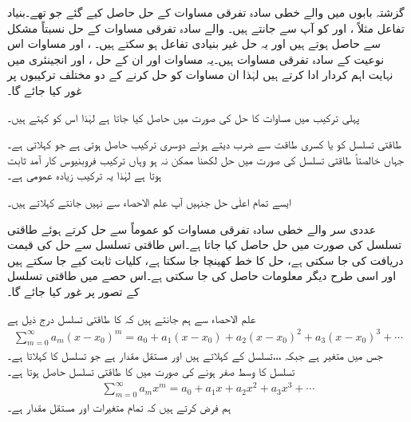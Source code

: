 گزشتہ بابوں میں  والے خطی سادہ تفرقی مساوات کے حل حاصل کیے گئے جو  تھے۔بنیاد تفاعل مثلاً ،  اور  کو آپ  سے جانتے ہیں۔ والے سادہ تفرقی مساوات کے حل نسبتاً مشکل سے حاصل ہوتے ہیں اور یہ حل غیر بنیادی تفاعل ہو سکتے ہیں۔ ،  اور  مساوات اس نوعیت کے سادہ تفرقی مساوات ہیں۔یہ مساوات اور ان کے حل ،  اور  انجینئری میں نہایت اہم کردار ادا کرتے ہیں لہٰذا ان مساوات کو حل کرنے کے دو مختلف ترکیبوں پر غور کیا جائے گا۔

پہلی ترکیب میں مساوات کا حل   کی صورت میں حاصل کیا جاتا ہے لہٰذا اس کو  کہتے ہیں۔

طاقتی تسلسل کو  یا کسری طاقت  سے ضرب دیتے ہوئے دوسری ترکیب حاصل ہوتی ہے جو  کہلاتی ہے۔جہاں خالصتاً طاقتی تسلسل کی صورت میں حل لکھنا ممکن نہ ہو وہاں ترکیب فروبنیوس کار آمد ثابت ہوتا ہے لہٰذا یہ ترکیب زیادہ عمومی ہے۔

ایسے تمام اعلٰی حل جنہیں آپ علم الاحصاء سے نہیں جانتے   کہلاتے ہیں۔

 عددی سر والے خطی سادہ تفرقی مساوات کو عموماً  سے حل کرتے ہوئے طاقتی تسلسل کی صورت میں حل حاصل کیا جاتا ہے۔اس طاقتی تسلسل سے حل کی قیمت دریافت کی جا سکتی ہے، حل کا خط کھینچا جا سکتا ہے، کلیات ثابت کیے جا سکتے ہیں اور اسی طرح دیگر معلومات حاصل کی جا سکتی ہے۔اس حصے میں طاقتی تسلسل کے تصور پر غور کیا جائے گا۔

علم الاحصاء سے ہم جانتے ہیں کہ  کا طاقتی تسلسل درج ذیل ہے
\begin{align}\label{مساوات_بیسل_تسلسل_الف} 
\sum_{m=0}^{\infty} a_m(x-x_0)^m=a_0+a_1(x-x_0)+a_2(x-x_0)^2+a_3(x-x_0)^3+\cdots
\end{align}
جس میں  متغیر ہے جبکہ ،،، تسلسل کے  کہلاتے ہیں اور  مستقل مقدار ہے جو تسلسل کا  کہلاتا ہے۔ تسلسل کا وسط صفر  ہونے کی صورت میں  کا طاقتی تسلسل حاصل ہوتا ہے۔
\begin{align} \label{مساوات_بیسل_تسلسل_ب} 
\sum_{m=0}^{\infty} a_m x^m=a_0+a_1 x+a_2 x^2+a_3 x^3+\cdots
\end{align}
ہم فرض کرتے ہیں کہ تمام متغیرات اور مستقل مقدار  ہے۔

